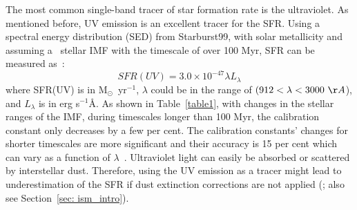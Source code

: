 The most common single-band tracer of star formation rate is the ultraviolet.
As mentioned before, UV emission is an excellent tracer for the SFR.
Using a spectral energy distribution (SED) from Starburst99, with solar metallicity and assuming a~\cite{Kroupa01} stellar IMF with the timescale of over 100 Myr, SFR can be measured as~\citep{Leitherer99}:
\begin{equation}
SFR(UV) = 3.0 \times 10^{-47}\lambda L_{\lambda}
\end{equation}
where SFR(UV) is in M$_{\odot}$~yr$^{-1}$, $\lambda$ could be in the range of $(912< \lambda < 3000~\AA$), and $L_{\lambda}$ is in erg s$^{-1}$\AA. %
As shown in Table~\ref{table1}, with changes in the stellar ranges of the IMF, during timescales longer than 100 Myr, the calibration constant only decreases by a few per cent.
The calibration constants' changes for shorter timescales are more significant and 
their accuracy is 15 per cent which can vary as a function of $\lambda$~\citep{Calzetti13}.
Ultraviolet light can easily be absorbed or scattered by interstellar dust. 
Therefore, using the UV emission as a tracer might lead to underestimation of the SFR if dust extinction corrections are not applied (\cite{Kennicutt12}; also see Section~\ref{sec: ism_intro}). 

